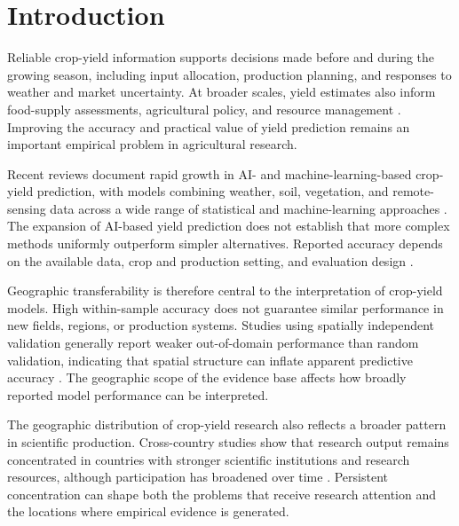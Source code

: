 \documentclass[ASNA,twocolumn]{USG}
\begin{document}

\maketitle

\section{Introduction}\label{sec:intro}


Reliable crop-yield information supports decisions made before and during the growing season,
including input allocation, production planning, and responses to weather and market
uncertainty. At broader scales, yield estimates also inform food-supply assessments,
agricultural policy, and resource management \cite{vanKlompenburg2020}. Improving the accuracy
and practical value of yield prediction remains an important empirical problem in
agricultural research.

Recent reviews document rapid growth in AI- and machine-learning-based crop-yield prediction,
with models combining weather, soil, vegetation, and remote-sensing data across a wide range of
statistical and machine-learning approaches \cite{Shawon2025,vanKlompenburg2020}. The expansion
of AI-based yield prediction does not establish that more complex methods uniformly outperform
simpler alternatives. Reported accuracy depends on the available data, crop and production setting,
and evaluation design \cite{Jabed2024}.

Geographic transferability is therefore central to the interpretation of crop-yield models.
High within-sample accuracy does not guarantee similar performance in new fields, regions, or
production systems. Studies using spatially independent validation generally report weaker
out-of-domain performance than random validation, indicating that spatial structure can
inflate apparent predictive accuracy \cite{Habibi2024,Okupska2026,Stiller2024}. The geographic scope of the evidence base affects how broadly reported model
performance can be interpreted.

The geographic distribution of crop-yield research also reflects a broader pattern in
scientific production. Cross-country studies show that research output remains concentrated
in countries with stronger scientific institutions and research resources, although
participation has broadened over time \cite{Bueno2025,CashGibson2018}. Persistent
concentration can shape both the problems that receive research attention and the locations
where empirical evidence is generated.
\end{document}
